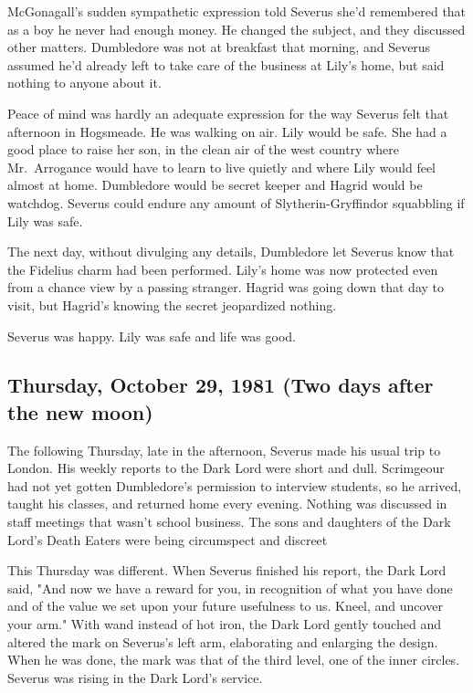 McGonagall's sudden sympathetic expression told Severus she'd remembered that as a boy he never had enough money. He changed the subject, and they discussed other matters. Dumbledore was not at breakfast that morning, and Severus assumed he'd already left to take care of the business at Lily's home, but said nothing to anyone about it.

Peace of mind was hardly an adequate expression for the way Severus felt that afternoon in Hogsmeade. He was walking on air. Lily would be safe. She had a good place to raise her son, in the clean air of the west country where Mr.~Arrogance would have to learn to live quietly and where Lily would feel almost at home. Dumbledore would be secret keeper and Hagrid would be watchdog. Severus could endure any amount of Slytherin-Gryffindor squabbling if Lily was safe.

The next day, without divulging any details, Dumbledore let Severus know that the Fidelius charm had been performed. Lily's home was now protected even from a chance view by a passing stranger. Hagrid was going down that day to visit, but Hagrid's knowing the secret jeopardized nothing.

Severus was happy. Lily was safe and life was good.

\subsection{Thursday, October 29, 1981 (Two days after the new moon)}

The following Thursday, late in the afternoon, Severus made his usual trip to London. His weekly reports to the Dark Lord were short and dull. Scrimgeour had not yet gotten Dumbledore's permission to interview students, so he arrived, taught his classes, and returned home every evening. Nothing was discussed in staff meetings that wasn't school business. The sons and daughters of the Dark Lord's Death Eaters were being circumspect and discreet{\el}

This Thursday was different. When Severus finished his report, the Dark Lord said, "And now we have a reward for you, in recognition of what you have done and of the value we set upon your future usefulness to us. Kneel, and uncover your arm." With wand instead of hot iron, the Dark Lord gently touched and altered the mark on Severus's left arm, elaborating and enlarging the design. When he was done, the mark was that of the third level, one of the inner circles. Severus was rising in the Dark Lord's service.

